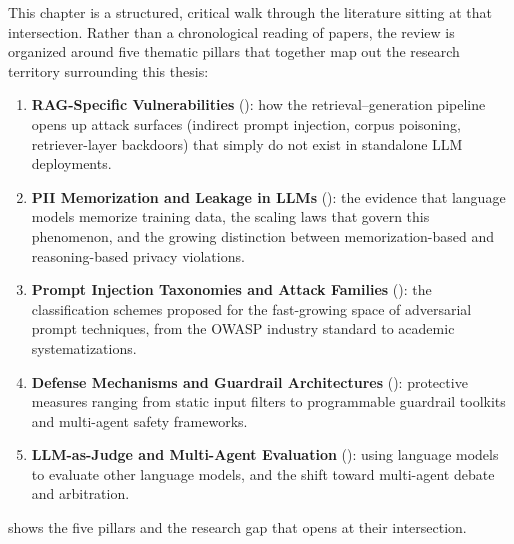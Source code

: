 \documentclass[12pt,a4paper]{report}
\begin{document}
This chapter is a structured, critical walk through the literature sitting at that intersection. Rather than a chronological reading of papers, the review is organized around five thematic pillars that together map out the research territory surrounding this thesis:

\begin{enumerate}[leftmargin=2em, itemsep=3pt]
  \item \textbf{RAG-Specific Vulnerabilities} (): how the retrieval--generation pipeline opens up attack surfaces (indirect prompt injection, corpus poisoning, retriever-layer backdoors) that simply do not exist in standalone LLM deployments.
  \item \textbf{PII Memorization and Leakage in LLMs} (): the evidence that language models memorize training data, the scaling laws that govern this phenomenon, and the growing distinction between memorization-based and reasoning-based privacy violations.
  \item \textbf{Prompt Injection Taxonomies and Attack Families} (): the classification schemes proposed for the fast-growing space of adversarial prompt techniques, from the OWASP industry standard to academic systematizations.
  \item \textbf{Defense Mechanisms and Guardrail Architectures} (): protective measures ranging from static input filters to programmable guardrail toolkits and multi-agent safety frameworks.
  \item \textbf{LLM-as-Judge and Multi-Agent Evaluation} (): using language models to evaluate other language models, and the shift toward multi-agent debate and arbitration.
\end{enumerate}

 shows the five pillars and the research gap that opens at their intersection.
\end{document}
